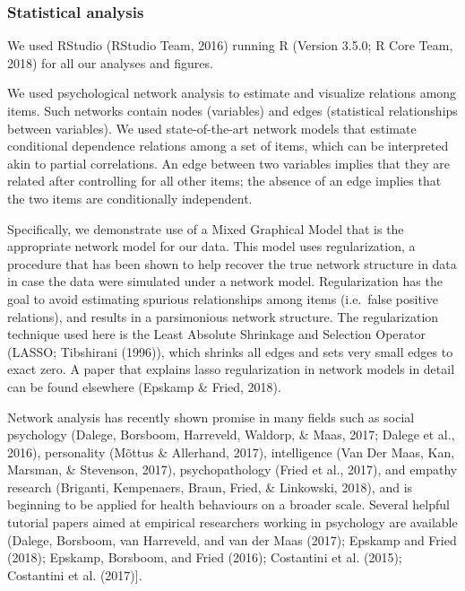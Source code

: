 \documentclass[english,floatsintext,]{apa6}
\theoremstyle{definition}
\theoremstyle{definition}
\theoremstyle{definition}
\theoremstyle{remark}
\begin{document}
\subsubsection{Statistical analysis}\label{statistical-analysis}

We used RStudio (RStudio Team, 2016) running R (Version 3.5.0; R Core
Team, 2018) for all our analyses and figures.

We used psychological network analysis to estimate and visualize
relations among items. Such networks contain nodes (variables) and edges
(statistical relationships between variables). We used state-of-the-art
network models that estimate conditional dependence relations among a
set of items, which can be interpreted akin to partial correlations. An
edge between two variables implies that they are related after
controlling for all other items; the absence of an edge implies that the
two items are conditionally independent.

Specifically, we demonstrate use of a Mixed Graphical Model that is the
appropriate network model for our data. This model uses regularization,
a procedure that has been shown to help recover the true network
structure in data in case the data were simulated under a network model.
Regularization has the goal to avoid estimating spurious relationships
among items (i.e.~false positive relations), and results in a
parsimonious network structure. The regularization technique used here
is the Least Absolute Shrinkage and Selection Operator (LASSO;
Tibshirani (1996)), which shrinks all edges and sets very small edges to
exact zero. A paper that explains lasso regularization in network models
in detail can be found elsewhere (Epskamp \& Fried, 2018).

Network analysis has recently shown promise in many fields such as
social psychology (Dalege, Borsboom, Harreveld, Waldorp, \& Maas, 2017;
Dalege et al., 2016), personality (Mõttus \& Allerhand, 2017),
intelligence (Van Der Maas, Kan, Marsman, \& Stevenson, 2017),
psychopathology (Fried et al., 2017), and empathy research (Briganti,
Kempenaers, Braun, Fried, \& Linkowski, 2018), and is beginning to be
applied for health behaviours on a broader scale. Several helpful
tutorial papers aimed at empirical researchers working in psychology are
available (Dalege, Borsboom, van Harreveld, and van der Maas (2017);
Epskamp and Fried (2018); Epskamp, Borsboom, and Fried (2016);
Costantini et al. (2015); Costantini et al. (2017){]}.
\end{document}
